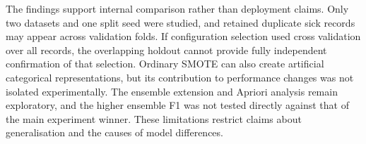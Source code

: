 The findings support internal comparison rather than deployment claims. Only two datasets and one split seed were studied, and retained duplicate sick records may appear across validation folds. If configuration selection used cross validation over all records, the overlapping holdout cannot provide fully independent confirmation of that selection. Ordinary SMOTE can also create artificial categorical representations, but its contribution to performance changes was not isolated experimentally. The ensemble extension and Apriori analysis remain exploratory, and the higher ensemble F1 was not tested directly against that of the main experiment winner. These limitations restrict claims about generalisation and the causes of model differences.
